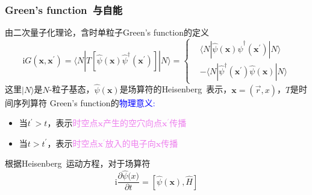 \documentclass[cjk,slidestop,compress,mathserif,blue]{beamer}
\begin{document}
{
	\frametitle{\textrm{Green's function~}与自能}
		由二次量子化理论，含时单粒子\textrm{Green's function}的定义
	\begin{displaymath}
		\mathrm{i}G(\mathbf{x},\mathbf{x}^{\prime})=\langle N|T[\hat\psi(\mathbf{x})\hat\psi^{\dag}(\mathbf{x}^{\prime})]|N\rangle=\left\{
		\begin{aligned}
			&\langle N|\hat\psi(\mathbf{x})\hat\psi^{\dag}(\mathbf{x}^{\prime})|N\rangle\\
			&-\langle N|\hat\psi^{\dag}(\mathbf{x}^{\prime})\hat\psi(\mathbf{x})|N\rangle
		\end{aligned}
		\right.
	\end{displaymath}
	这里$|N\rangle$是$N$-粒子基态，$\hat\psi(\mathbf{x})$是场算符的\textrm{Heisenberg~}表示，$\mathbf{x}=(\vec r,x)$，$T$是时间序列算符
	\vskip 5pt
	\textrm{Green's function}的\textcolor{blue}{物理意义:~}\\
	\begin{itemize}
		\item 当$t^{\prime}>t$，表示\textcolor{violet}{时空点$\mathbf{x}$产生的空穴向点$\mathbf{x^{\prime}}$传播}
		\item 当$t>t^{\prime}$，表示\textcolor{violet}{时空点$\mathbf{x}^{\prime}$放入的电子向$\mathbf{x}$传播}
	\end{itemize}
	根据\textrm{Heisenberg~}运动方程，对于场算符
	\begin{displaymath}
		\mathrm{i}\frac{\partial\hat\psi\mathbf(x)}{\partial t}=[\hat\psi(\mathbf{x}),\hat H]
	\end{displaymath}
	\vskip -5pt
	\fontsize{8.5pt}{6.2pt}
}
\end{document}
